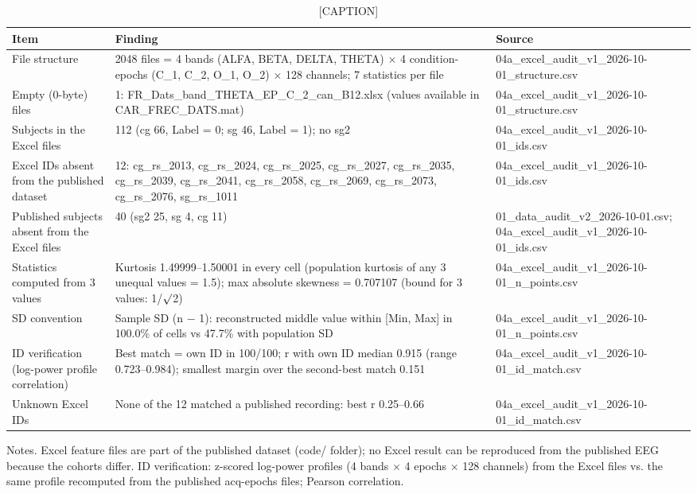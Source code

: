 \begin{table}[htbp]
\centering
\caption{[CAPTION]}
\label{tab:TableS5}
\footnotesize
\begin{tabular}{p{3.5cm}p{9cm}p{3.5cm}}
\toprule
Item & Finding & Source \\
\midrule
File structure & 2048 files = 4 bands (ALFA, BETA, DELTA, THETA) $\times$ 4 condition-epochs (C\_1, C\_2, O\_1, O\_2) $\times$ 128 channels; 7 statistics per file & 04a\_excel\_audit\_v1\_2026-10-01\_structure.csv \\
Empty (0-byte) files & 1: FR\_Dats\_band\_THETA\_EP\_C\_2\_can\_B12.xlsx (values available in CAR\_FREC\_DATS.mat) & 04a\_excel\_audit\_v1\_2026-10-01\_structure.csv \\
Subjects in the Excel files & 112 (cg 66, Label = 0; sg 46, Label = 1); no sg2 & 04a\_excel\_audit\_v1\_2026-10-01\_ids.csv \\
Excel IDs absent from the published dataset & 12: cg\_rs\_2013, cg\_rs\_2024, cg\_rs\_2025, cg\_rs\_2027, cg\_rs\_2035, cg\_rs\_2039, cg\_rs\_2041, cg\_rs\_2058, cg\_rs\_2069, cg\_rs\_2073, cg\_rs\_2076, sg\_rs\_1011 & 04a\_excel\_audit\_v1\_2026-10-01\_ids.csv \\
Published subjects absent from the Excel files & 40 (sg2 25, sg 4, cg 11) & 01\_data\_audit\_v2\_2026-10-01.csv; 04a\_excel\_audit\_v1\_2026-10-01\_ids.csv \\
Statistics computed from 3 values & Kurtosis 1.49999--1.50001 in every cell (population kurtosis of any 3 unequal values = 1.5); max absolute skewness = 0.707107 (bound for 3 values: 1/$\surd$2) & 04a\_excel\_audit\_v1\_2026-10-01\_n\_points.csv \\
SD convention & Sample SD (n $-$ 1): reconstructed middle value within [Min, Max] in 100.0\% of cells vs 47.7\% with population SD & 04a\_excel\_audit\_v1\_2026-10-01\_n\_points.csv \\
ID verification (log-power profile correlation) & Best match = own ID in 100/100; r with own ID median 0.915 (range 0.723--0.984); smallest margin over the second-best match 0.151 & 04a\_excel\_audit\_v1\_2026-10-01\_id\_match.csv \\
Unknown Excel IDs & None of the 12 matched a published recording: best r 0.25--0.66 & 04a\_excel\_audit\_v1\_2026-10-01\_id\_match.csv \\
\bottomrule
\end{tabular}
\par\smallskip
\begin{minipage}{\textwidth}\raggedright\scriptsize
Notes. Excel feature files are part of the published dataset (code/ folder); no Excel result can be reproduced from the published EEG because the cohorts differ. ID verification: z-scored log-power profiles (4 bands $\times$ 4 epochs $\times$ 128 channels) from the Excel files vs. the same profile recomputed from the published acq-epochs files; Pearson correlation.
\end{minipage}
\end{table}
